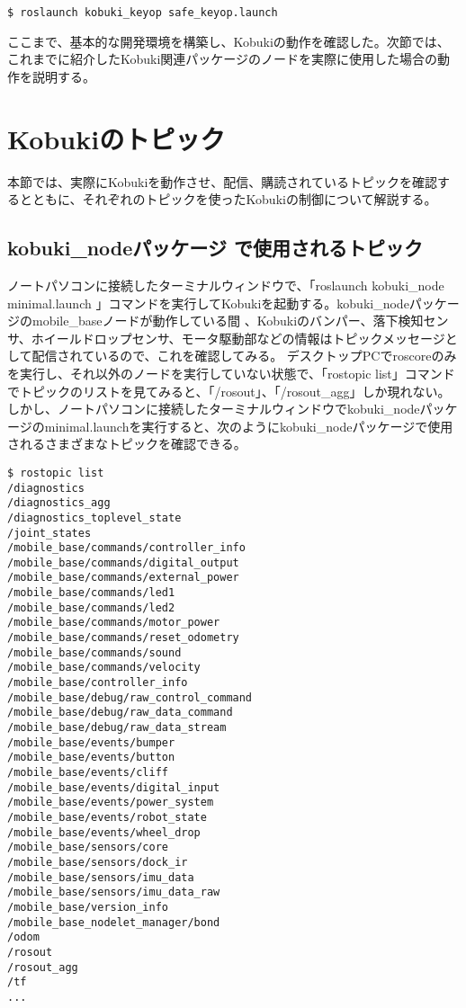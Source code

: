 \begin{itemize}
\begin{exercise}
\begin{lstlisting}[language=ROS]
$ roslaunch kobuki_keyop safe_keyop.launch
\end{lstlisting}

\end{exercise}

ここまで、基本的な開発環境を構築し、Kobukiの動作を確認した。次節では、これまでに紹介したKobuki関連パッケージのノードを実際に使用した場合の動作を説明する。

\section{Kobukiのトピック}

本節では、実際にKobukiを動作させ、配信、購読されているトピックを確認するとともに、それぞれのトピックを使ったKobukiの制御について解説する。

\subsection{kobuki\_nodeパッケージ  で使用されるトピック}

ノートパソコンに接続したターミナルウィンドウで、「roslaunch kobuki\_node minimal.launch 」コマンドを実行してKobukiを起動する。kobuki\_nodeパッケージのmobile\_baseノードが動作している間 、Kobukiのバンパー、落下検知センサ、ホイールドロップセンサ、モータ駆動部などの情報はトピックメッセージとして配信されているので、これを確認してみる。
デスクトップPCでroscoreのみを実行し、それ以外のノードを実行していない状態で、「rostopic list」コマンドでトピックのリストを見てみると、「/rosout」、「/rosout\_agg」しか現れない。しかし、ノートパソコンに接続したターミナルウィンドウでkobuki\_nodeパッケージのminimal.launchを実行すると、次のようにkobuki\_nodeパッケージで使用されるさまざまなトピックを確認できる。

\begin{lstlisting}[language=ROS]
$ rostopic list
/diagnostics
/diagnostics_agg
/diagnostics_toplevel_state
/joint_states
/mobile_base/commands/controller_info
/mobile_base/commands/digital_output
/mobile_base/commands/external_power
/mobile_base/commands/led1
/mobile_base/commands/led2
/mobile_base/commands/motor_power
/mobile_base/commands/reset_odometry
/mobile_base/commands/sound
/mobile_base/commands/velocity
/mobile_base/controller_info
/mobile_base/debug/raw_control_command
/mobile_base/debug/raw_data_command
/mobile_base/debug/raw_data_stream
/mobile_base/events/bumper
/mobile_base/events/button
/mobile_base/events/cliff
/mobile_base/events/digital_input
/mobile_base/events/power_system
/mobile_base/events/robot_state
/mobile_base/events/wheel_drop
/mobile_base/sensors/core
/mobile_base/sensors/dock_ir
/mobile_base/sensors/imu_data
/mobile_base/sensors/imu_data_raw
/mobile_base/version_info
/mobile_base_nodelet_manager/bond
/odom
/rosout
/rosout_agg
/tf
...
\end{lstlisting}


\end{itemize}
